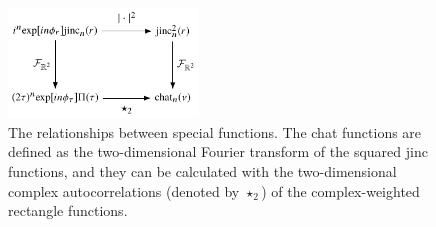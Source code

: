 \documentclass[]{osa-article}
\begin{document}
\begin{figure}[ht]
 \centering
   \centering
   \includegraphics[width = 0.45\textwidth]{../figures/special/special.pdf}
   \caption{The relationships between special functions. The chat functions are
     defined as the two-dimensional Fourier transform of the squared jinc
     functions, and they can be calculated with the two-dimensional complex
     autocorrelations (denoted by $\star_2$) of the complex-weighted rectangle
     functions.}
   \label{fig:special}
 \end{figure}
\end{document}
